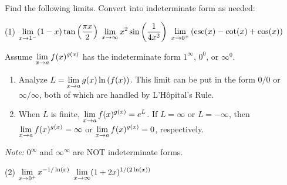 \documentclass[mathNotesPreamble]{subfiles}
\begin{document}

\begin{ex*}
  Find the following limits. Convert into indeterminate form as needed:
\end{ex*}
\begin{tasks}[after-item-skip=\stretch{1}, label=~](1)
  \task $\ds\lim_{x\to 1\inv[]}(1-x)\tan\parens{\frac{\pi x}{2}}$
  \task $\ds\lim_{x\to \infty} x^2\sin\parens{\frac{1}{4x^2}}$
  \task $\ds\lim_{x\to 0^+} \parens{\csc(x)-\cot(x)+\cos(x)}$
\end{tasks}
\pagebreak

\begin{thmBox*}
  Assume $\ds\lim_{x\to a} f(x)^{g(x)}$ has the indeterminate form $1^\infty$, $0^0$, or $\infty^0$.
  \begin{enumerate}
    \item Analyze $L=\ds\lim_{x\to a} g(x)\ln\parens{f(x)}$. This limit can be put in the form $0/0$ or $\infty/\infty$, both of which are handled by L'H\^opital's Rule.
    \item When $L$ is finite, $\ds\lim_{x\to a} f(x)^{g(x)}= e^L$. If $L=\infty$ or $L=-\infty$, then \newline$\ds\lim_{x\to a} f(x)^{g(x)}=\infty$ or $\ds\lim_{x\to a} f(x)^{g(x)}=0$, respectively.
  \end{enumerate}
  
  \textit{Note:} $0^\infty$ and $\infty^\infty$ are NOT indeterminate forms.
\end{thmBox*}

\begin{tasks}[after-item-skip=\stretch{1}, label=~](2)
  \task $\ds\lim_{x\to 0^+} x^{-1/\ln(x)}$
  \task $\ds\lim_{x\to \infty} (1+2x)^{1/(2\ln(x))}$
\end{tasks}
\pagebreak
\end{document}
